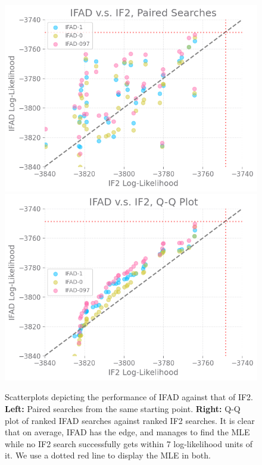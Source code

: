 \documentclass{article}
\begin{document}
\begin{figure}[htbp!]
    \centering
    \includegraphics[scale=0.53]{../imgs/095/pairs.png}
    \includegraphics[scale=0.53]{../imgs/095/qq.png}
    \caption{Scatterplots depicting the performance of IFAD against that of IF2. \textbf{Left:} Paired searches from the same starting point. \textbf{Right:} Q-Q plot of ranked IFAD searches against ranked IF2 searches. It is clear that on average, IFAD has the edge, and manages to find the MLE while no IF2 search successfully gets within 7 log-likelihood units of it. We use a dotted red line to display the MLE in both. }

    \label{fig:scatter}
\end{figure}
\end{document}
